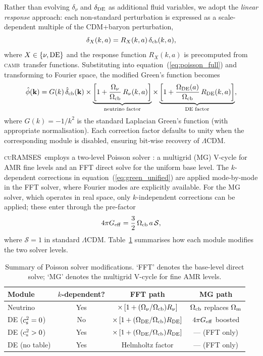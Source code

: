 \documentclass[fleqn,usenatbib]{mnras}
\newcommand{\curamses}{\textsc{cuRAMSES}}
\newcommand{\camb}{\textsc{camb}}
\newcommand{\Onu}{\Omega_\nu}
\newcommand{\Ocb}{\Omega_{\rm cb}}
\newcommand{\Om}{\Omega_{\rm m}}
\newcommand{\Ode}{\Omega_{\rm DE}}
\newcommand{\Rnu}{R_\nu}
\newcommand{\Rde}{R_{\rm DE}}
\newcommand{\cst}{c_{\rm s}^2}
\begin{document}
Rather than evolving $\delta_\nu$ and $\delta_{\rm DE}$ as additional
fluid variables, we adopt the \emph{linear response} approach: each
non-standard perturbation is expressed as a scale-dependent multiple of
the CDM+baryon perturbation,
\begin{equation}
\delta_X(k,a) = R_X(k,a)\,\delta_{\rm cb}(k,a),
\label{eq:linear_response}
\end{equation}
where $X \in \{\nu, {\rm DE}\}$ and the response function $R_X(k,a)$
is precomputed from \camb\ transfer functions.  Substituting into
equation~(\ref{eq:poisson_full}) and transforming to Fourier space,
the modified Green's function becomes
\begin{equation}
\hat{\phi}(\mathbf{k}) = G(k)\,\hat{\delta}_{\rm cb}(\mathbf{k})
  \times \underbrace{\left[1 + \frac{\Onu}{\Ocb}\,\Rnu(k,a)\right]}_{\text{neutrino factor}}
  \times \underbrace{\left[1 + \frac{\Ode(a)}{\Ocb}\,\Rde(k,a)\right]}_{\text{DE factor}},
\label{eq:green_unified}
\end{equation}
where $G(k) = -1/k^2$ is the standard Laplacian Green's function
(with appropriate normalisation).  Each correction factor defaults to
unity when the corresponding module is disabled, ensuring bit-wise
recovery of $\Lambda$CDM.

\curamses\ employs a two-level Poisson solver \citep{Guillet2011,Kim2026}:
a multigrid (MG) V-cycle for AMR fine levels and an FFT direct solve
for the uniform base level.  The $k$-dependent corrections in
equation~(\ref{eq:green_unified}) are applied mode-by-mode in the FFT
solver, where Fourier modes are explicitly available.  For the MG
solver, which operates in real space, only $k$-independent corrections
can be applied; these enter through the pre-factor
\begin{equation}
4\pi G_{\rm eff} = \frac{3}{2}\,\Ocb\,a\,\mathcal{S},
\label{eq:fourpi}
\end{equation}
where $\mathcal{S} = 1$ in standard $\Lambda$CDM.  Table~\ref{tab:solver_summary}
summarises how each module modifies the two solver levels.

\begin{table}
\centering
\caption{Summary of Poisson solver modifications.  `FFT' denotes the
  base-level direct solve; `MG' denotes the multigrid V-cycle for
  fine AMR levels.}
\label{tab:solver_summary}
\small
\begin{tabular}{lccc}
\toprule
Module & $k$-dependent? & FFT path & MG path \\
\midrule
Neutrino         & Yes           & $\times\,[1+(\Onu/\Ocb)\Rnu]$ & $\Ocb$ replaces $\Om$ \\
DE ($\cst=0$)    & No            & $\times\,[1+(\Ode/\Ocb)\Rde]$ & $4\pi G_{\rm eff}$ boosted \\
DE ($\cst>0$)    & Yes           & $\times\,[1+(\Ode/\Ocb)\Rde]$ & --- (FFT only) \\
DE (no table)    & Yes           & Helmholtz factor & --- (FFT only) \\
\bottomrule
\end{tabular}
\end{table}
\end{document}
